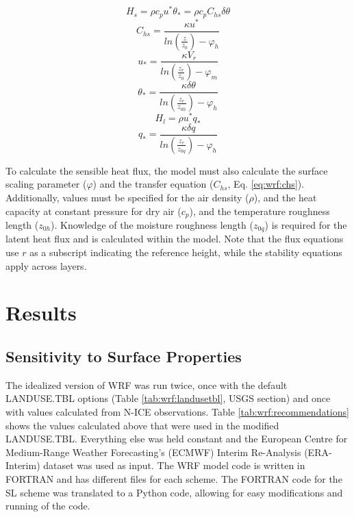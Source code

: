 \begin{equation}\label{eq:wrf:h}
H_{s} = \rho c_{p} u^{*} \theta_{*} = \rho c_{p} C_{hs} \delta \theta
\end{equation}
\begin{equation}\label{eq:wrf:chs}
C_{hs} = \frac{\kappa u^{*}}{ln (\frac{z}{z_{0}}) - \varphi_{h}}
\end{equation}
\begin{equation}\label{eq:wrf:ustar}
u_{*} = \frac{\kappa V_{r}}{ln(\frac{z_{r}}{z_{0}}) - \varphi_{m}}
\end{equation}
\begin{equation}\label{eq:wrf:thetastar}
\theta_{*} = \frac{\kappa \delta \theta}{ln(\frac{z_{r}}{z_{0h}}) - \varphi_{h}} 
\end{equation}
\begin{equation}\label{eq:wrf:e}
H_{l} = \rho u^{*} q_{*}
\end{equation}
\begin{equation}\label{eq:wrf:q*}
q_{*} = \frac{\kappa \delta q}{ln(\frac{z_{r}}{z_{0q}}) - \varphi_{h}}
\end{equation}

To calculate the sensible heat flux, the model must also calculate the surface scaling parameter ($\varphi$) and the transfer equation ($C_{hs}$, Eq. \ref{eq:wrf:chs}). Additionally, values must be specified for the air density ($\rho$), and the heat capacity at constant pressure for dry air ($c_{p}$), and the temperature roughness length ($z_{0h}$). Knowledge of the moisture roughness length ($z_{0q}$) is required for the latent heat flux and is calculated within the model. Note that the flux equations use $r$ as a subscript indicating the reference height, while the stability equations apply across layers.

\section{Results}
\subsection{Sensitivity to Surface Properties}
The idealized version of WRF was run twice, once with the default LANDUSE.TBL options (Table \ref{tab:wrf:landusetbl}, USGS section) and once with values calculated from N-ICE observations. Table \ref{tab:wrf:recommendations} shows the values calculated above that were used in the modified LANDUSE.TBL. Everything else was held constant and the European Centre for Medium-Range Weather Forecasting’s (ECMWF) Interim Re-Analysis (ERA-Interim) dataset was used as input. The WRF model code is written in FORTRAN and has different files for each scheme. The FORTRAN code for the SL scheme was translated to a Python code, allowing for easy modifications and running of the code. 

